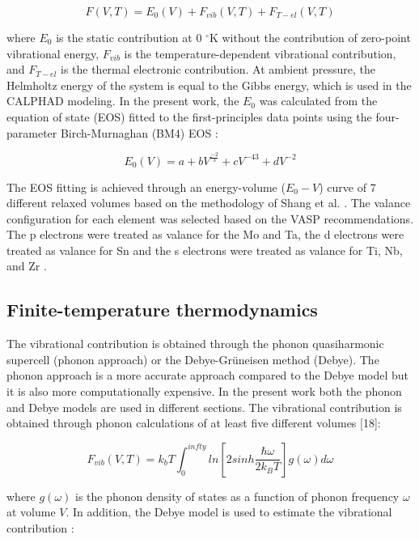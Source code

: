 \begin{equation}
\label{eq: helmholtz}
F(V,T) = E_{0}(V) + F_{vib}(V,T) + F_{T-el}(V,T)
\end{equation}

where $E_0$ is the static contribution at 0 $^\circ$K without the contribution of zero-point vibrational energy, $F_{vib}$ is the temperature-dependent vibrational contribution, and $F_{T-el}$ is the thermal electronic contribution. At ambient pressure, the Helmholtz energy of the system is equal to the Gibbs energy, which is used in the CALPHAD modeling. In the present work, the $E_0$ was calculated from the equation of state (EOS) fitted to the first-principles data points using the four-parameter Birch-Murnaghan (BM4) EOS \cite{Shang2010}:

\begin{equation}
\label{eq: zeroenergy}
E_{0}(V) = a + bV^{\frac{-2}{3}} + cV^{{-4}{3}} + dV^{-2}
\end{equation}

The EOS fitting is achieved through an energy-volume ($E_{0}-V$) curve of 7 different relaxed volumes based on the methodology of Shang et al. \cite{Shang2010}. The valance configuration for each element was selected based on the VASP recommendations. The p electrons were treated as valance for the Mo and Ta, the d electrons were treated as valance for Sn and the s electrons were treated as valance for Ti, Nb, and Zr \cite{Kresse1996,Kresse1999}. 

\subsection{Finite-temperature thermodynamics}

 The vibrational contribution is obtained through the phonon quasiharmonic supercell (phonon approach) or the Debye-Grüneisen method (Debye). The phonon approach is a more accurate approach compared to the Debye model but it is also more computationally expensive. In the present work both the phonon and Debye models are used in different sections. The vibrational contribution is obtained through phonon calculations of at least five different volumes [18]: 

\begin{equation}
\label{eq: phonon}
F_{vib}(V,T) = k_{b}T \int_{0}^{infty} ln[2sinh\frac{\hbar \omega}{2k_BT}] g(\omega) d\omega
\end{equation}

where $g(\omega)$ is the phonon density of states as a function of phonon frequency $\omega$ at volume $V$.  In addition, the Debye model is used to estimate the vibrational contribution \cite{Shang2010}: 

